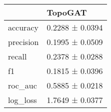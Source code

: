 \begin{tabular}{ll}
\toprule
 & TopoGAT \\
\midrule
accuracy & 0.2288 ± 0.0394 \\
precision & 0.1995 ± 0.0509 \\
recall & 0.2378 ± 0.0288 \\
f1 & 0.1815 ± 0.0396 \\
roc_auc & 0.5885 ± 0.0218 \\
log_loss & 1.7649 ± 0.0377 \\
\bottomrule
\end{tabular}
